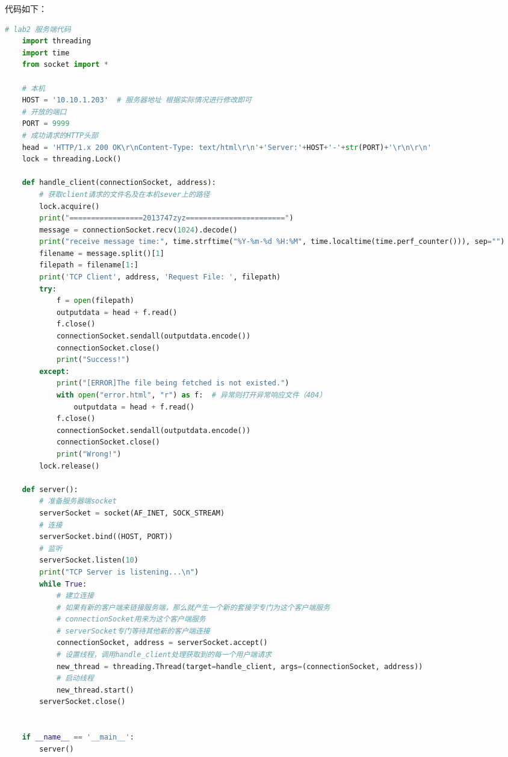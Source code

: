\documentclass[a4paper,12pt]{report}
\begin{document}
\begin{spacing}{1.5}
代码如下：
\begin{spacing}{1}  
	\begin{lstlisting}[language={Python}]
    # lab2 服务端代码
    import threading
    import time
    from socket import *
    
    # 本机
    HOST = '10.10.1.203'  # 服务器地址 根据实际情况进行修改即可
    # 开放的端口
    PORT = 9999
    # 成功请求的HTTP头部
    head = 'HTTP/1.x 200 OK\r\nContent-Type: text/html\r\n'+'Server:'+HOST+'-'+str(PORT)+'\r\n\r\n'
    lock = threading.Lock()
    
    def handle_client(connectionSocket, address):
        # 获取client请求的文件名及在本机sever上的路径
        lock.acquire()
        print("=================2013747zyz=======================")
        message = connectionSocket.recv(1024).decode()
        print("receive message time:", time.strftime("%Y-%m-%d %H:%M", time.localtime(time.perf_counter())), sep="")
        filename = message.split()[1]
        filepath = filename[1:]
        print('TCP Client', address, 'Request File: ', filepath)
        try:
            f = open(filepath)
            outputdata = head + f.read()
            f.close()
            connectionSocket.sendall(outputdata.encode())
            connectionSocket.close()
            print("Success!")
        except:
            print("[ERROR]The file being fetched is not existed.")
            with open("error.html", "r") as f:  # 异常则打开异常响应文件（404）
                outputdata = head + f.read()
            f.close()
            connectionSocket.sendall(outputdata.encode())
            connectionSocket.close()
            print("Wrong!")
        lock.release()
    
    def server():
        # 准备服务器端socket
        serverSocket = socket(AF_INET, SOCK_STREAM)
        # 连接
        serverSocket.bind((HOST, PORT))
        # 监听
        serverSocket.listen(10)
        print("TCP Server is listening...\n")
        while True:
            # 建立连接
            # 如果有新的客户端来链接服务端，那么就产生一个新的套接字专门为这个客户端服务
            # connectionSocket用来为这个客户端服务
            # serverSocket专门等待其他新的客户端连接
            connectionSocket, address = serverSocket.accept()
            # 设置线程，调用handle_client处理获取到的每一个用户端请求
            new_thread = threading.Thread(target=handle_client, args=(connectionSocket, address))
            # 启动线程
            new_thread.start()
        serverSocket.close()
    
    
    if __name__ == '__main__':
        server()
    

\end{lstlisting}
\end{spacing}
\end{spacing}
\end{document}
